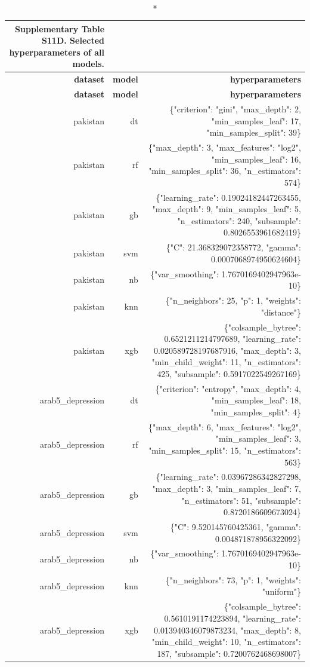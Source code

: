 \documentclass[10pt]{article}
\begin{document}
\tiny
\setlength{\tabcolsep}{2pt}
\begin{longtable}{rrr}
\caption*{\textbf{Supplementary Table S11D.} Selected hyperparameters of all models.}\\
\toprule
\textbf{dataset} & \textbf{model} & \textbf{hyperparameters} \\
\midrule
\endfirsthead
\toprule
\textbf{dataset} & \textbf{model} & \textbf{hyperparameters} \\
\midrule
\endhead
\bottomrule
\endfoot
pakistan & dt & \{"criterion": "gini", "max\_depth": 2, "min\_samples\_leaf": 17, "min\_samples\_split": 39\} \\
pakistan & rf & \{"max\_depth": 3, "max\_features": "log2", "min\_samples\_leaf": 16, "min\_samples\_split": 36, "n\_estimators": 574\} \\
pakistan & gb & \{"learning\_rate": 0.19024182447263455, "max\_depth": 9, "min\_samples\_leaf": 5, "n\_estimators": 240, "subsample": 0.8026553961682419\} \\
pakistan & svm & \{"C": 21.368329072358772, "gamma": 0.0007068974950624604\} \\
pakistan & nb & \{"var\_smoothing": 1.7670169402947963e-10\} \\
pakistan & knn & \{"n\_neighbors": 25, "p": 1, "weights": "distance"\} \\
pakistan & xgb & \{"colsample\_bytree": 0.6521211214797689, "learning\_rate": 0.020589728197687916, "max\_depth": 3, "min\_child\_weight": 11, "n\_estimators": 425, "subsample": 0.5917022549267169\} \\
arab5\_depression & dt & \{"criterion": "entropy", "max\_depth": 4, "min\_samples\_leaf": 18, "min\_samples\_split": 4\} \\
arab5\_depression & rf & \{"max\_depth": 6, "max\_features": "log2", "min\_samples\_leaf": 3, "min\_samples\_split": 15, "n\_estimators": 563\} \\
arab5\_depression & gb & \{"learning\_rate": 0.03967286342827298, "max\_depth": 3, "min\_samples\_leaf": 7, "n\_estimators": 51, "subsample": 0.8720186609673024\} \\
arab5\_depression & svm & \{"C": 9.520145760425361, "gamma": 0.004871878956322092\} \\
arab5\_depression & nb & \{"var\_smoothing": 1.7670169402947963e-10\} \\
arab5\_depression & knn & \{"n\_neighbors": 73, "p": 1, "weights": "uniform"\} \\
arab5\_depression & xgb & \{"colsample\_bytree": 0.5610191174223894, "learning\_rate": 0.013940346079873234, "max\_depth": 8, "min\_child\_weight": 10, "n\_estimators": 187, "subsample": 0.7200762468698007\} \\

\end{longtable}
\end{document}
